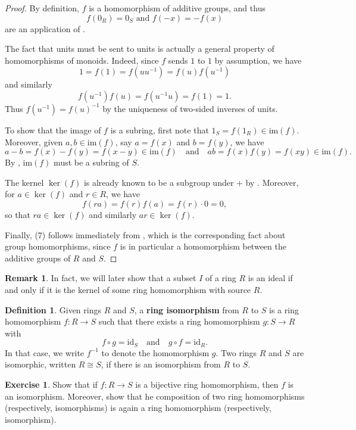 \documentclass[12pt]{report}
\numberwithin{equation}{section}
\numberwithin{theorem}{chapter}
\theoremstyle{definition}
\newtheorem{definition}[theorem]{Definition}
\newtheorem{exercise}{Exercise}
\newtheorem*{basic properties}{Basic Properties}
\newtheorem*{Important Remark}{Important Remark}
\newtheorem{remark}[theorem]{Remark}
\newcommand{\df}[1]{{\bf #1}\index{#1}}
\renewcommand{\ker}{\operatorname{ker}}
\begin{document}
\begin{proof} 
By definition, $f$ is a homomorphism of additive groups, and thus
$$f(0_R) = 0_S \text{ and } f(-x)=-f(x)$$
are an application of .

The fact that units must be sent to units is actually a general property of homomorphisms of monoids. Indeed, since $f$ sends $1$ to $1$ by assumption, we have 
$$1 = f(1) = f(u u^{-1}) = f(u) f(u^{-1})$$ 
and similarly 
$$f(u^{-1}) f(u) = f(u^{-1}u) = f(1) = 1.$$ 
Thus $f(u^{-1}) = f(u)^{-1}$ by the uniqueness of two-sided inverses of units.

To show that the image of $f$ is a subring, first note that $1_S = f(1_R) \in \mathrm{im}(f)$. Moreover, given $a, b \in \mathrm{im}(f)$, say $a = f(x)$ and $b = f(y)$, we have
$$a-b = f(x) - f(y) = f(x-y) \in \mathrm{im}(f) \quad \text{and} \quad ab = f(x)f(y)=f(xy) \in \mathrm{im}(f).$$
By , $\mathrm{im}(f)$ must be a subring of $S$.

The kernel $\ker(f)$ is already known to be a subgroup under $+$ by . Moreover, for $a \in \ker(f)$ and $r \in R$, we have 
$$f(ra) = f(r) f(a) = f(r) \cdot 0 = 0,$$ 
so that $ra \in \ker(f)$ and similarly $ar \in \ker(f)$. 

Finally, (7) follows immediately from , which is the corresponding fact about group homomorphisms, since $f$ is in particular a homomorphism between the additive groups of $R$ and $S$.
\end{proof}


\begin{remark} 
In fact, we will later show that a subset $I$ of a ring $R$ is an ideal if and only if it is the kernel of some ring homomorphism with source $R$.
\end{remark}



\begin{definition}
 Given rings $R$ and $S$, a \df{ring isomorphism} from $R$ to $S$ is a ring homomorphism $f\!: R \to S$ such that there exists a ring homomorphism $g\!: S \to R$ with 
$$f \circ g = \mathrm{id}_S \quad \text{and} \quad g \circ f = \mathrm{id}_R.$$
In that case, we write $f^{-1}$ to denote the homomorphism $g$.
Two rings $R$ and $S$ are isomorphic, written $R \cong S$, if there is an isomorphism from $R$ to $S$.
\end{definition}


\begin{exercise}
	Show that if $f\!: R \to S$ is a bijective ring homomorphism, then $f$ is an isomorphism. Moreover, show that he composition of two ring homomorphisms (respectively, isomorphisms) is again a ring homomorphism (respectively, isomorphism).
\end{exercise}
\end{document}
